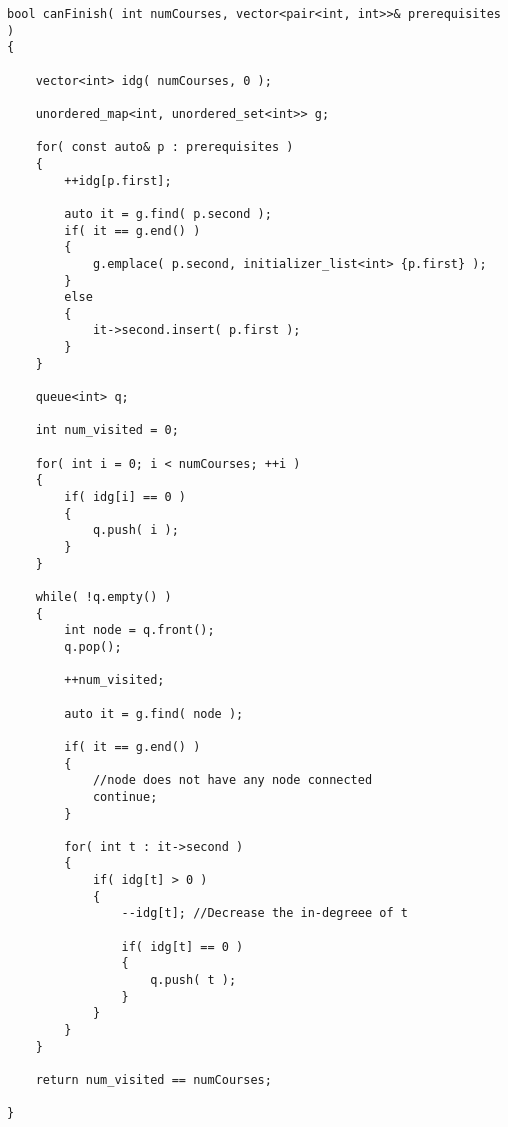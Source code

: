 \begin{lstlisting}[style=customc, caption={BFS}]
bool canFinish( int numCourses, vector<pair<int, int>>& prerequisites )
{

    vector<int> idg( numCourses, 0 );

    unordered_map<int, unordered_set<int>> g;

    for( const auto& p : prerequisites )
    {
        ++idg[p.first];

        auto it = g.find( p.second );
        if( it == g.end() )
        {
            g.emplace( p.second, initializer_list<int> {p.first} );
        }
        else
        {
            it->second.insert( p.first );
        }
    }

    queue<int> q;

    int num_visited = 0;

    for( int i = 0; i < numCourses; ++i )
    {
        if( idg[i] == 0 )
        {
            q.push( i );
        }
    }

    while( !q.empty() )
    {
        int node = q.front();
        q.pop();

        ++num_visited;

        auto it = g.find( node );

        if( it == g.end() )
        {
            //node does not have any node connected
            continue;
        }

        for( int t : it->second )
        {
            if( idg[t] > 0 )
            {
                --idg[t]; //Decrease the in-degreee of t

                if( idg[t] == 0 )
                {
                    q.push( t );
                }
            }
        }
    }

    return num_visited == numCourses;

}
\end{lstlisting}
